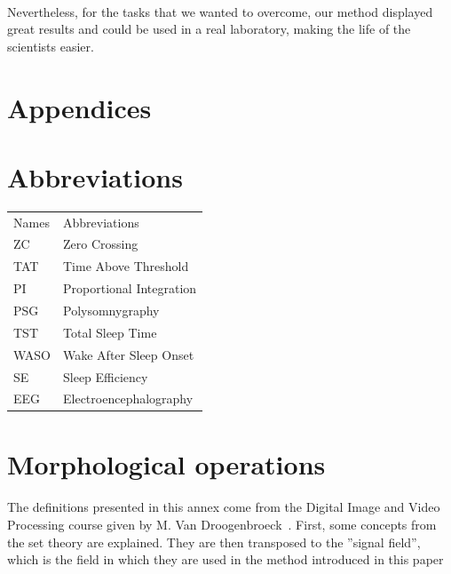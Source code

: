 \documentclass[a4paper,12pt]{article}
\newlength\savewidth
\newcommand\Ghline{%
	\noalign{\global\savewidth\arrayrulewidth\global\arrayrulewidth2pt}%
	\hline
	\noalign{\global\arrayrulewidth\savewidth}}
\begin{document}
\paragraph{}
Nevertheless, for the tasks that we wanted to overcome, our method displayed great results and could be used in a real laboratory, making the life of the scientists easier.

\newpage
\section{Appendices}
\appendix

\section{Abbreviations}
\label{sec:abbreviations}
\begin{center}
\begin{tabular}{|l|l|}
\hline
Names & Abbreviations \\
\Ghline
ZC & Zero Crossing \\
TAT & Time Above Threshold \\
PI & Proportional Integration \\
PSG & Polysomnygraphy \\
TST & Total Sleep Time \\
WASO & Wake After Sleep Onset \\
SE & Sleep Efficiency \\
EEG & Electroencephalography \\
\hline
\end{tabular}
\end{center}


\newpage

\section{Morphological operations}
\label{sec:morphology}

\paragraph{}
The definitions presented in this annex come from the Digital Image and Video Processing course given by M. Van Droogenbroeck~\cite{VanDroogenbroeck2013}. First, some concepts from the set theory are explained. They are then transposed to the ''signal field'', which is the field in which they are used in the method introduced in this paper
\end{document}
